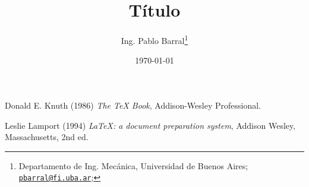\documentclass[10pt,a4paper]{article}
\title{Título}
\author{Ing. Pablo Barral\thanks{Departamento de Ing. Mecánica, Universidad de Buenos Aires; 
     \href{mailto:pbarral@fi.uba.ar}{\texttt{pbarral@fi.uba.ar}};
     \raisebox{0.25ex}{\href{https://www.linkedin.com/in/pablo-barral}{\texttt{[image: linkedin\_logo.png]}}}}
     }
\date{\today}
\begin{document}
     
     
       
     

     \begin{thebibliography}{9}
          Donald E. Knuth (1986) \emph{The \TeX{} Book}, Addison-Wesley Professional.
          
          Leslie Lamport (1994) \emph{\LaTeX: a document preparation system}, Addison
          Wesley, Massachusetts, 2nd ed.
      \end{thebibliography}
\end{document}
